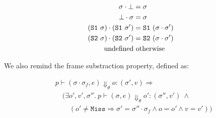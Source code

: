 \documentclass[,a4paper,oneside]{article}
\newcommand{\code}[1]{\texttt{#1}}
\newcommand{\st}[0]{\sigma}
\newcommand{\evalsto}[3]{\ensuremath{p\vdash(#1)\Downarrow_\theta#2:(#3)}}
\newcommand{\Miss}[0]{\code{Miss}}
\begin{document}
\begin{align*}
	\sigma \cdot \bot &= \sigma\\
	\bot \cdot \sigma &= \sigma\\
	(\sone\st) \cdot (\sone\st') &= \sone(\st\cdot\st')\\
	(\stwo\st) \cdot (\stwo\st') &= \stwo(\st\cdot\st')\\
	\text{undefined}&\text{ otherwise}
\end{align*}

We also remind the frame substraction property, defined as:


\begin{align*}
	&\evalsto{\st\cdot\st_f,e}{o}{\st',v}\Longrightarrow\\
	&\quad(\exists o',v',\st''.~\evalsto{\st,e}{o'}{\st'',v'}~\land\\
	&\qquad(o'\neq \Miss \Rightarrow \st'=\st''\cdot\st_f\land o=o'\land v=v'))
\end{align*}

\newcommand{\swap}[0]{\code{swap}}
\end{document}
